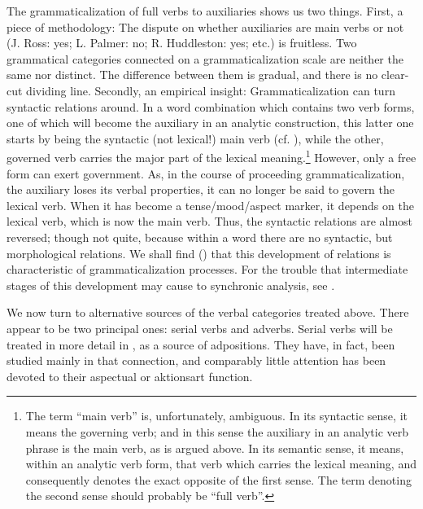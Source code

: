 The grammaticalization of full verbs to auxiliaries shows us two things. First, a piece of methodology: The dispute on whether auxiliaries are main verbs or not (J. Ross: yes; L. Palmer: no; R. Huddleston: yes; etc.) is fruitless. Two grammatical categories connected on a grammaticalization scale are neither the same nor distinct. The difference between them is gradual, and there is no clear-cut dividing line. Secondly, an empirical insight: Grammaticalization can turn syntactic relations around. In a word combination which contains two verb forms, one of which will become the auxiliary in an analytic construction, this latter one starts by being the syntactic (not lexical!) main verb (cf. \citealt[96f]{Givón1979}), while the other, governed verb carries the major part of the lexical meaning.\footnote{The term ``main verb'' is, unfortunately, ambiguous. In its syntactic sense, it means the governing verb; and in this sense the auxiliary in an analytic verb phrase is the main verb, as is argued above. In its semantic sense, it means, within an analytic verb form, that verb which carries the lexical meaning, and consequently denotes the exact opposite of the first sense. The term denoting the second sense should probably be ``full verb''.} However, only a free form can exert government. As, in the course of proceeding grammaticalization, the auxiliary loses its verbal properties, it can no longer be said to govern the lexical verb.\label{page36} When it has become a tense/mood/aspect marker, it depends on the lexical verb, which is now the main verb. Thus, the syntactic relations are almost reversed; though not quite, because within a word there are no syntactic, but morphological relations. We shall find () that this development of relations is characteristic of grammaticalization processes. For the trouble that intermediate stages of this development may cause to synchronic analysis, see \citet[155f]{Matthews1981}.

\newpage
We now turn to alternative sources of the verbal categories treated above. There appear to be two principal ones: serial verbs and adverbs. Serial verbs will be treated in more detail in , as a source of adpositions. They have, in fact, been studied mainly in that connection, and comparably little attention has been devoted to their aspectual or aktionsart function.

